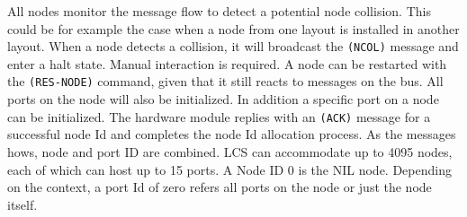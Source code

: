 \begin{table}[ht!]
    \centering 
\end{table}

All nodes monitor the message flow to detect a potential node collision. This could be for example the case when a node from one layout is installed in another layout. When a node detects a collision, it will broadcast the \texttt{(NCOL)} message and enter a halt state. Manual interaction is required. A node can be restarted with the \texttt{(RES-NODE)} command, given that it still reacts to messages on the bus. All ports on the node will also be initialized. In addition a specific port on a node can be initialized. The hardware module replies with an \texttt{(ACK)} message for a successful node Id and completes the node Id allocation process. As the messages hows, node and port ID are combined. LCS can accommodate up to 4095 nodes, each of which can host up to 15 ports. A Node ID 0 is the NIL node. Depending on the context, a port Id of zero refers all ports on the node or just the node itself.


